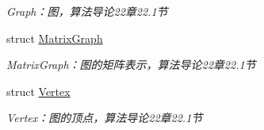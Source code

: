\begin{DoxyCompactItemize}
\begin{DoxyCompactList}\small\item\em Graph：图，算法导论22章22.1节 \end{DoxyCompactList}\item 
struct \hyperlink{struct_introduction_to_algorithm_1_1_graph_algorithm_1_1_matrix_graph}{Matrix\+Graph}
\begin{DoxyCompactList}\small\item\em Matrix\+Graph：图的矩阵表示，算法导论22章22.1节 \end{DoxyCompactList}\item 
struct \hyperlink{struct_introduction_to_algorithm_1_1_graph_algorithm_1_1_vertex}{Vertex}
\begin{DoxyCompactList}\small\item\em Vertex：图的顶点，算法导论22章22.1节 \end{DoxyCompactList}\end{DoxyCompactItemize}
